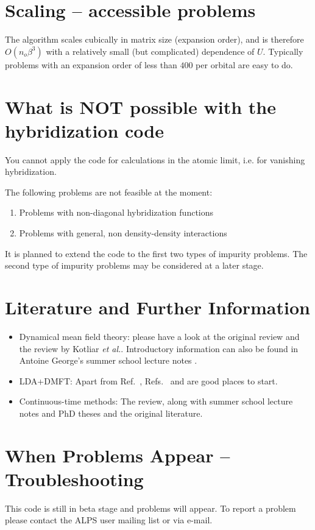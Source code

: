 \documentclass[aps,prb,floatfix,superscriptaddress,twocolumn,notitlepage]{revtex4-1}
\begin{document}
\section{Scaling -- accessible problems}
The algorithm scales cubically in matrix size (expansion order), and is therefore $O(n_o\beta^3)$ with a relatively small (but complicated) dependence of $U$. Typically problems
with an expansion order of less than $400$ per orbital are easy to do.

\section{What is NOT possible with the hybridization code}

You cannot apply the code for calculations in the atomic limit, i.e. for vanishing hybridization.


The following problems are not feasible at the moment:
\begin{enumerate}
\item Problems with non-diagonal hybridization functions
\item Problems with general, non density-density interactions
\end{enumerate}
It is planned to extend the code to the first two types of impurity problems. The second type of impurity problems may be considered at a later stage.

\section{Literature and Further Information}
\begin{itemize}
\item Dynamical mean field theory: please have a look at the original review\cite{Georges96} and the review by Kotliar {\it et al.}\cite{Kotliar06}. Introductory information can also be found in Antoine George's summer school lecture notes \cite{Georges04}.
\item LDA+DMFT: Apart from Ref.~, Refs.~ and  are good places to start.
\item Continuous-time methods: The review\cite{Gull11_review}, along with summer school lecture notes\cite{sherbrookenote} and PhD theses\cite{GullPhD} and the original literature.\cite{Rubtsov05,Rubtsov04,Werner06}
\end{itemize}
\section{When Problems Appear -- Troubleshooting}
This code is still in beta stage and problems will appear. To report a problem please contact the ALPS user mailing list or \Emanuel via e-mail.
\end{document}
